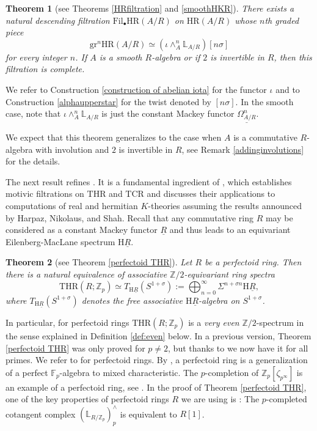 \documentclass[10pt]{amsart}
\newtheorem{thm}{Theorem}[section]
\theoremstyle{definition}
\numberwithin{equation}{section}
\newcommand{\F}{\mathbb{F}}
\renewcommand{\L}{\mathbb{L}}
\newcommand{\Z}{\mathbb{Z}}
\newcommand{\rH}{\mathrm{H}}
\newcommand{\ul}{\underline}
\newcommand{\gr}{\mathrm{gr}}
\newcommand{\Fil}{\mathrm{Fil}}
\newcommand{\HR}{\mathrm{HR}}
\newcommand{\THR}{\mathrm{THR}}
\newcommand{\TCR}{\mathrm{TCR}}
\begin{document}
\begin{thm}
[see Theorems \ref{HRfiltration} and \ref{smoothHKR}]
\label{thm1.1}
There exists a natural descending filtration $\Fil_\bullet \HR(A/R)$ on $\HR(A/R)$ whose $n$th graded piece
\[
\gr^n \HR(A/R)
\simeq
(\iota \wedge_{A}^n  \L_{A/R})[n\sigma]
\]
for every integer $n$. If $A$ is a smooth $R$-algebra or if $2$ is invertible in $R$,
then this filtration is complete.
\end{thm}

We refer to Construction \ref{construction of abelian iota} for the functor $\iota$ and to Construction \ref{alphaupperstar} for the twist denoted by $[n\sigma]$. In the smooth case, note that $\iota \wedge_A^n \L_{A/R}$ is just the constant Mackey functor $\ul{\Omega_{A/R}^n}$.

We expect that this theorem  generalizes to the case when $A$ is a commutative $R$-algebra with involution and $2$ is invertible in $R$,
see Remark \ref{addinginvolutions} for the details.

The next result refines \cite[Theorem 6.1]{BMS19}.
It is a fundamental ingredient of \cite{Par23},
which establishes motivic filtrations on $\THR$ and $\TCR$ and discusses their applications to computations of real and hermitian $K$-theories assuming the results announced by Harpaz, Nikolaus, and Shah.
Recall that any commutative ring
$R$ may be considered as a constant Mackey functor $\ul{R}$ and thus leads to an equivariant Eilenberg-MacLane spectrum $\rH \ul{R}$.

\begin{thm}[see Theorem \ref{perfectoid THR}]
\label{introtheorem}
Let $R$ be a perfectoid ring.
Then there is a natural equivalence of
associative $\Z/2$-equivariant ring spectra
\[
\THR(R;\Z_p)
\simeq
T_{\rH \ul{R}} (S^{1+\sigma})
:=
\bigoplus_{n=0}^\infty
\Sigma^{n+\sigma n} \rH \ul{R},
\]
where $T_{\rH \ul{R}}(S^{1+\sigma})$ denotes the free associative $\rH \ul{R}$-algebra on $S^{1+\sigma}$.
\end{thm}

In particular, 
for perfectoid rings $\THR(R;\Z_p)$ is a \emph{very even} $\Z/2$-spectrum in the sense explained in Definition \ref{def:even} below.
In a previous version, Theorem \ref{perfectoid THR} was only proved for $p \neq 2$, but thanks to \cite[Theorem 6.20]{Par23} we now have it for all primes.
We refer to \cite[Definition 3.5]{BMS18} for perfectoid rings.
By \cite[Example 3.15]{BMS18},
a perfectoid ring is a generalization of a perfect $\F_p$-algebra to mixed characteristic.
The $p$-completion of $\Z_p[\zeta_{p^\infty}]$ is an example of a perfectoid ring,
see \cite[Example 3.6]{BMS18}.
In the proof of Theorem \ref{perfectoid THR},
one of the key properties of perfectoid rings $R$ we are using is \cite[Proposition 4.19(2)]{BMS19}: The $p$-completed cotangent complex $(\L_{R/\Z_p})_p^\wedge$ is equivalent to $R[1]$.
\end{document}
